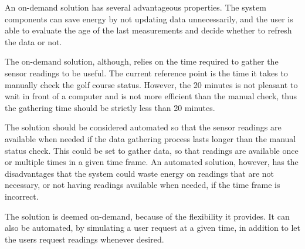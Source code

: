 \iffalse
\begin{enumerate}
	\item The system user will use an interface to demand readings from the sensors in the network.
	\item The main node responds to the demand by sending a request packet in the network.
	\item The nodes receiving the signal gathers data from its sensors and sends it back to its parent.
	\item When the sent packet is acknowledged, the node retransmits the recently received request signal and awaits data.
	\item Step 3 and 4 is repeated throughout the network, so that every node within reach of the network will transmit or relay data to its parent.
	\item The main node collects all data and append each reading to the respective node in a data sheet available to the user.
\end{enumerate}
\fi

An on-demand solution has several advantageous properties. The system components can save energy by not updating data unnecessarily, and the user is able to evaluate the age of the last measurements and decide whether to refresh the data or not. 

The on-demand solution, although, relies on the time required to gather the sensor readings to be useful. The current reference point is the time it takes to manually check the golf course status. However, the 20 minutes  is not pleasant to wait in front of a computer and is not more efficient than the manual check, thus the gathering time should be strictly less than 20 minutes.

The solution should be considered automated so that the sensor readings are available when needed if the data gathering process lasts longer than the manual status check. This could be set to gather data, so that readings are available once or multiple times in a given time frame. An automated solution, however, has the disadvantages that the system could waste energy on readings that are not necessary, or not having readings available when needed, if the time frame is incorrect.

The solution is deemed on-demand, because of the flexibility it provides. It can also be automated, by simulating a user request at a given time, in addition to let the users request readings whenever desired.

